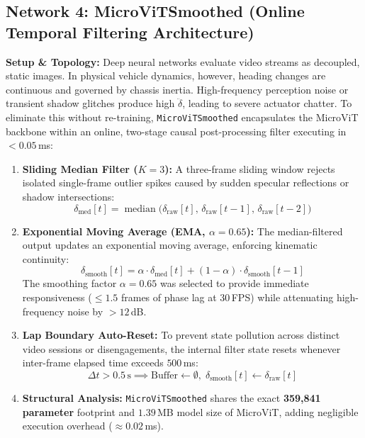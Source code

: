 \documentclass[10pt,journal,compsoc]{IEEEtran}
\begin{document}
\subsection{Network 4: MicroViTSmoothed (Online Temporal Filtering Architecture)}
\textbf{Setup \& Topology:} Deep neural networks evaluate video streams as decoupled, static images. In physical vehicle dynamics, however, heading changes are continuous and governed by chassis inertia. High-frequency perception noise or transient shadow glitches produce high $\ddot{\delta}$, leading to severe actuator chatter. 
To eliminate this without re-training, \texttt{MicroViTSmoothed} encapsulates the MicroViT backbone within an online, two-stage causal post-processing filter executing in $< 0.05$\,ms:
\begin{enumerate}
    \item \textbf{Sliding Median Filter ($K=3$):} A three-frame sliding window rejects isolated single-frame outlier spikes caused by sudden specular reflections or shadow intersections:
    \begin{equation}
    \delta_{\text{med}}[t] = \operatorname{median}\big(\delta_{\text{raw}}[t], \, \delta_{\text{raw}}[t-1], \, \delta_{\text{raw}}[t-2]\big)
    \end{equation}
    \item \textbf{Exponential Moving Average (EMA, $\alpha=0.65$):} The median-filtered output updates an exponential moving average, enforcing kinematic continuity:
    \begin{equation}
    \delta_{\text{smooth}}[t] = \alpha \cdot \delta_{\text{med}}[t] + (1 - \alpha) \cdot \delta_{\text{smooth}}[t-1]
    \end{equation}
    The smoothing factor $\alpha = 0.65$ was selected to provide immediate responsiveness ($\le 1.5$ frames of phase lag at 30\,FPS) while attenuating high-frequency noise by $>12$\,dB.
    \item \textbf{Lap Boundary Auto-Reset:} To prevent state pollution across distinct video sessions or disengagements, the internal filter state resets whenever inter-frame elapsed time exceeds $500$\,ms:
    \begin{equation}
    \Delta t > 0.5\,\text{s} \implies \text{Buffer} \leftarrow \emptyset, \; \delta_{\text{smooth}}[t] \leftarrow \delta_{\text{raw}}[t]
    \end{equation}
    \item \textbf{Structural Analysis:} \texttt{MicroViTSmoothed} shares the exact \textbf{359,841 parameter} footprint and $1.39$\,MB model size of MicroViT, adding negligible execution overhead ($\approx 0.02$\,ms).
\end{enumerate}
\end{document}
